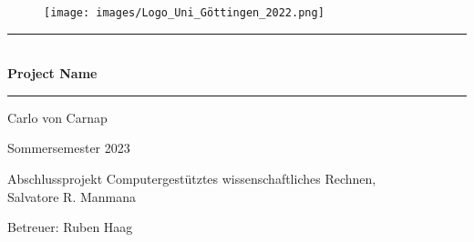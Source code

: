 \begin{titlepage}
    \centering
    \vspace*{1.5cm}
    \begin{figure}[H]
        \texttt{[image: images/Logo\_Uni\_Göttingen\_2022.png]}
    \end{figure}
    \vspace*{2.2cm}
    
    \rule{\textwidth}{1pt}\\[0.5cm]
    {\huge \bfseries
      Project Name}\\
    \rule{\textwidth}{1pt}
    
    \vspace*{2.7cm}
    
    {\large Carlo von Carnap\\
    
    \vspace*{0.7cm}

    Sommersemester 2023}
    
    \vspace*{4.7cm}

    {\large Abschlussprojekt Computergestütztes wissenschaftliches Rechnen, \\
    Salvatore R. Manmana

    \vspace*{0.7cm}
    
    Betreuer: Ruben Haag}

    \end{titlepage}